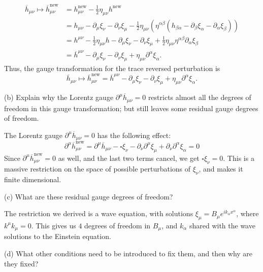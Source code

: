\documentclass{../../templates/lkx_pset}
\begin{document}
\begin{parts}
  \[
    \begin{aligned}
    \overline{h}_{\mu\nu} \mapsto 
    \overline{h}^{\textrm{new}}_{\mu\nu} 
    &= h_{\mu\nu}^{\textrm{new}} - \frac{1}{2}\eta_{\mu\nu} h^{\textrm{new}}\\
    &= h_{\mu\nu} - \partial_\mu \xi_\nu - \partial_\nu \xi_\mu - \frac{1}{2}\eta_{\mu\nu}(\eta^{\alpha\beta} (h_{\beta\alpha} - \partial_{\beta}\xi_\alpha - \partial_{\alpha}\xi_\beta))\\
    &= h^{\mu\nu} - \frac{1}{2}\eta_{\mu\nu}h - \partial_\mu \xi_\nu - \partial_\nu \xi_\mu + \frac{1}{2}\eta_{\mu\nu} \eta^{\alpha\beta}\partial_\alpha\xi_\beta\\
    &= \overline{h}^{\mu\nu} - \partial_\mu \xi_\nu - \partial_\nu \xi_\mu + \eta_{\mu\nu}\partial^\alpha\xi_\alpha.
    \end{aligned}
  \]
  Thus, the gauge transformation for the trace reversed perturbation is 
  \[
    \overline{h}_{\mu\nu} \mapsto \overline{h}_{\mu\nu}^{\textrm{new}}  
  = \overline{h}^{\mu\nu} - \partial_\mu \xi_\nu - \partial_\nu \xi_\mu + \eta_{\mu\nu}\partial^\alpha\xi_\alpha.\]
  \begin{part}{(b)}
    Explain why the Lorentz gauge $\partial^\mu \overline{h}_{\mu\nu}=0$ restricts almost all the degrees of freedom in this gauge transformation; but still leaves some residual gauge degrees of freedom.
  \end{part}

  The Lorentz gauge $\partial^\mu \overline{h}_{\mu\nu} = 0$ has the following effect:
  \[
    \partial^\mu \overline{h}_{\mu\nu}^{\textrm{new}} = \partial^\mu \overline{h}_{\mu\nu} - \square \xi_\nu - \partial_\nu\partial^\mu \xi_\mu + \partial_\nu \partial^\alpha \xi_\alpha = 0
  \]
  Since $\partial^\mu \overline{h}^\textrm{new}_{\mu\nu} = 0$ as well, and the last two terms cancel, we get $\square \xi_\nu = 0$. This is a massive restriction on the space of possible perturbations of $\xi_\nu$, and makes it finite dimensional.

  \begin{part}{(c)}
    What are these residual gauge degrees of freedom?
  \end{part}
  The restriction we derived is a wave equation, with solutions $\xi_\mu = B_\mu e^{ik_\alpha x^\alpha}$, where $k^\mu k_\mu = 0$. This gives us $4$ degrees of freedom in $B_\mu$, and $k_\alpha$ shared with the wave solutions to the Einstein equation.

  \begin{part}{(d)}
    What other conditions need to be introduced to fix them, and then why are they fixed?
  \end{part}


\end{parts}
\end{document}

